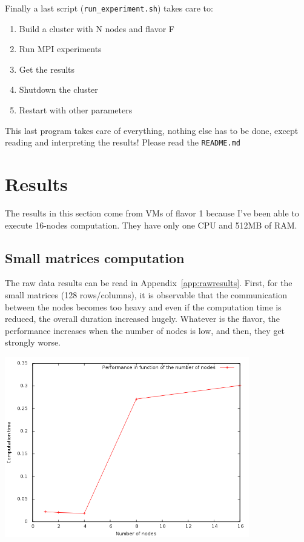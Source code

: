 \documentclass[a4paper,11pt]{article}
\begin{document}
Finally a last script (\texttt{run\_experiment.sh}) takes care to:
\begin{enumerate}
  \item Build a cluster with N nodes and flavor F
  \item Run MPI experiments
  \item Get the results
  \item Shutdown the cluster
  \item Restart with other parameters
\end{enumerate}

This last program takes care of everything, nothing else has to be done, except
reading and interpreting the results! Please read the \texttt{README.md}

\section{Results}

The results in this section come from VMs of flavor 1 because I've been able to execute 16-nodes
computation. They have only one CPU and 512MB of RAM.

\subsection{Small matrices computation}

The raw data results can be read in Appendix~\ref{app:rawresults}. First, for the
small matrices (128 rows/columns), it is observable that the communication between the
nodes becomes too heavy and even if the computation time is reduced, the overall
duration increased hugely. Whatever is the flavor, the performance increases
when the number of nodes is low, and then, they get strongly worse.

\begin{center}
  \includegraphics[width=0.8\textwidth]{./128perf.png}
\end{center}
\end{document}
